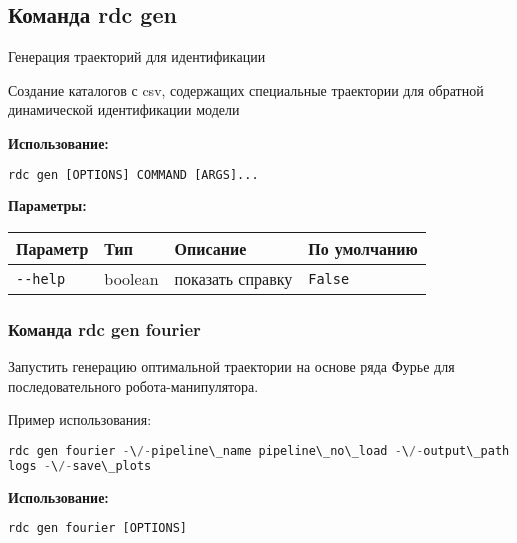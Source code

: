 \hypertarget{rdc-gen}{%
\subsection{Команда rdc gen}\label{rdc-gen}}

Генерация траекторий для идентификации

Создание каталогов с csv, содержащих специальные траектории для обратной динамической идентификации модели

\textbf{Использование:}
\begin{lstlisting}[language=python, numbers=none, frame=single]
rdc gen [OPTIONS] COMMAND [ARGS]...
\end{lstlisting}

\textbf{Параметры:}
\begin{center}
\fontsize{10pt}{10pt}\selectfont
\begin{longtable}[]{p{5cm}|p{2cm}|p{3.5cm}|p{5cm}}
    \hline
\toprule()
Параметр & Тип & Описание & По умолчанию \\
\hline
\midrule()
\endhead
\texttt{-\/-help} & boolean & показать справку &
\texttt{False} \\
\bottomrule()
\hline
\end{longtable}
\end{center}

\hypertarget{rdc-gen-fourier}{%
\subsubsection{Команда rdc gen fourier}\label{rdc-gen-fourier}}

Запустить генерацию оптимальной траектории на основе ряда Фурье для последовательного робота-манипулятора.

Пример использования:
\begin{lstlisting}[language=python, numbers=none, frame=single]
rdc gen fourier -\/-pipeline\_name pipeline\_no\_load -\/-output\_path
logs -\/-save\_plots
\end{lstlisting}

\textbf{Использование:}
\begin{lstlisting}[language=python, numbers=none, frame=single]
rdc gen fourier [OPTIONS]
\end{lstlisting}

